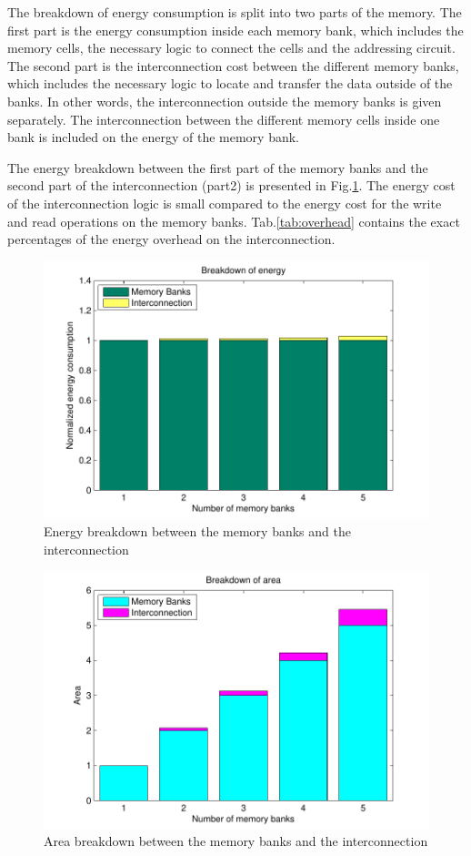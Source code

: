 The breakdown of energy consumption is split into two parts of the memory.
The first part is the energy consumption inside each memory bank, which includes the memory cells, the necessary logic to connect the cells and the addressing circuit.
The second part is the interconnection cost between the different memory banks, which includes the necessary logic to locate and transfer the data outside of the banks. 
In other words, the interconnection outside the memory banks is given separately. 
The interconnection between the different memory cells inside one bank is included on the energy of the memory bank.

The energy breakdown between the first part of the memory banks and the second part of the interconnection (part2) is presented in Fig.\ref{fig:energyE}.
The energy cost of the interconnection logic is small compared to the energy cost for the write and read operations on the memory banks.
Tab.\ref{tab:overhead} contains the exact percentages of the energy overhead on the interconnection. 

\begin{figure}
 \centering
 \includegraphics[width = \textwidth]{E/energy.pdf}
  \caption{Energy breakdown between the memory banks and the interconnection}
 \label{fig:energyE}
 \end{figure}
 
 \begin{figure}
 \centering
 \includegraphics[width = \textwidth]{E/area.pdf}
  \caption{Area breakdown between the memory banks and the interconnection}
 \label{fig:areaE}
 \end{figure}
 
